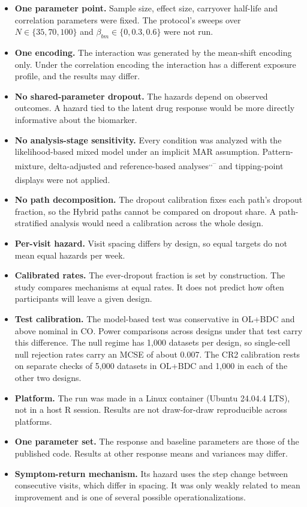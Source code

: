 \documentclass[
  11pt,
]{article}
\providecommand{\tightlist}{%
  \setlength{\itemsep}{0pt}\setlength{\parskip}{0pt}}
\begin{document}
\begin{itemize}
\tightlist
\item
  \textbf{One parameter point.} Sample size, effect size, carryover
  half-life and correlation parameters were fixed. The protocol's
  sweeps over \(N \in \{35, 70, 100\}\) and \(\beta_{bm} \in \{0, 0.3,
  0.6\}\) were not run.
\item
  \textbf{One encoding.} The interaction was generated by the mean-shift
  encoding only. Under the correlation encoding the interaction has a
  different exposure profile, and the results may differ.
\item
  \textbf{No shared-parameter dropout.} The hazards depend on observed
  outcomes. A hazard tied to the latent drug response would be more
  directly informative about the biomarker.
\item
  \textbf{No analysis-stage sensitivity.} Every condition was analyzed with
  the likelihood-based mixed model under an implicit MAR assumption.
  Pattern-mixture, delta-adjusted and reference-based analyses\textsuperscript{,,--} and tipping-point displays\textsuperscript{} were not applied.
\item
  \textbf{No path decomposition.} The dropout calibration fixes each path's
  dropout fraction, so the Hybrid paths cannot be compared on
  dropout share. A path-stratified analysis would need a calibration
  across the whole design.
\item
  \textbf{Per-visit hazard.} Visit spacing differs by design, so equal
  targets do not mean equal hazards per week.
\item
  \textbf{Calibrated rates.} The ever-dropout fraction is set by
  construction. The study compares mechanisms at equal rates. It does
  not predict how often participants will leave a given design.
\item
  \textbf{Test calibration.} The model-based test was conservative in
  OL+BDC and above nominal in CO. Power comparisons across designs
  under that test carry this difference. The null regime has
  1,000 datasets per design, so single-cell null
  rejection rates carry an MCSE of about
  0.007. The CR2 calibration rests
  on separate checks of 5,000 datasets in OL+BDC and
  1,000 in each of the other two designs.
\item
  \textbf{Platform.} The run was made in a Linux container
  (Ubuntu 24.04.4 LTS), not in a host R session. Results are not
  draw-for-draw reproducible across platforms.
\item
  \textbf{One parameter set.} The response and baseline parameters are
  those of the published code. Results at other response means and
  variances may differ.
\item
  \textbf{Symptom-return mechanism.} Its hazard uses the step change
  between consecutive visits, which differ in spacing. It was only
  weakly related to mean improvement and is one of several possible
  operationalizations.
\end{itemize}
\end{document}
